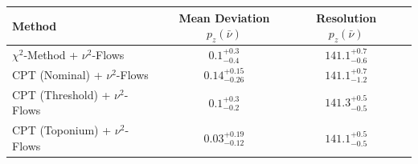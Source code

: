     \begin{tabular}{lccc}
        \toprule
        Method & Mean Deviation $p_{z}(\bar{\nu})$ & Resolution $p_{z}(\bar{\nu})$ \\
        \midrule
        $\chi^2$-Method + $\nu^2$-Flows & $0.1^{+0.3}_{-0.4}$ & $141.1^{+0.7}_{-0.6}$ \\
        CPT (Nominal) + $\nu^2$-Flows & $0.14^{+0.15}_{-0.26}$ & $141.1^{+0.7}_{-1.2}$ \\
        CPT (Threshold) + $\nu^2$-Flows & $0.1^{+0.3}_{-0.2}$ & $141.3^{+0.5}_{-0.5}$ \\
        CPT (Toponium) + $\nu^2$-Flows & $0.03^{+0.19}_{-0.12}$ & $141.1^{+0.5}_{-0.5}$ \\
        \bottomrule
    \end{tabular}